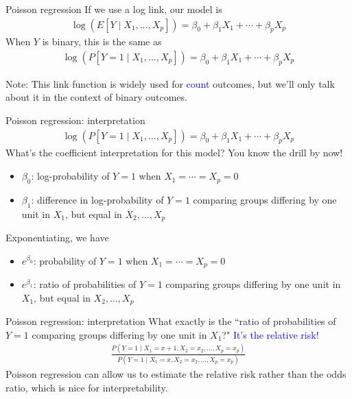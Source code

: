 \documentclass[10pt,t]{beamer}
\begin{document}
\begin{frame}{Poisson regression}
	If we use a log link, our model is
	\begin{align*}
		\log(E[Y \mid X_1,\dots,X_p]) = \beta_0 + \beta_1X_1 + \cdots + \beta_pX_p
	\end{align*}
	When $Y$ is binary, this is the same as
	\begin{align*}
		\log(P[Y = 1 \mid X_1,\dots,X_p]) = \beta_0 + \beta_1X_1 + \cdots + \beta_pX_p
	\end{align*}
	\vfill
	\begin{footnotesize}Note: This link function is widely used for \textcolor{blue}{count} outcomes, but we'll only talk about it in the context of binary outcomes. \end{footnotesize}
\end{frame}

\begin{frame}{Poisson regression: interpretation}
		\begin{align*}
		\log(P[Y = 1 \mid X_1,\dots,X_p]) = \beta_0 + \beta_1X_1 + \cdots + \beta_pX_p
	\end{align*}
	What's the coefficient interpretation for this model? You know the drill by now!
	\begin{itemize}
		\item $\beta_0$: log-probability of $Y = 1$ when $X_1 = \cdots = X_p = 0$ 
		\item $\beta_1$: difference in log-probability of $Y = 1$ comparing groups differing by one unit in $X_1$, but equal in $X_2,\dots,X_p$
	\end{itemize}
	Exponentiating, we have
	\begin{itemize}
			\item $e^{\beta_0}$: probability of $Y = 1$ when $X_1 = \cdots = X_p = 0$ 
	\item $e^{\beta_1}$: ratio of probabilities of $Y = 1$ comparing groups differing by one unit in $X_1$, but equal in $X_2,\dots,X_p$
	\end{itemize}
\end{frame}

\begin{frame}{Poisson regression: interpretation}
	What exactly is the ``ratio of probabilities of $Y = 1$ comparing groups differing by one unit in $X_1$?" \textcolor{blue}{It's the relative risk!}
	\begin{align*}
		\frac{P(Y = 1 \mid X_1 = x+1, X_2 = x_2, \dots, X_p = x_p)}{P(Y = 1 \mid X_1 = x, X_2 = x_2, \dots, X_p = x_p)}
	\end{align*}
	Poisson regression can allow us to estimate the relative risk rather than the odds ratio, which is nice for interpretability. 
\end{frame}
\end{document}
